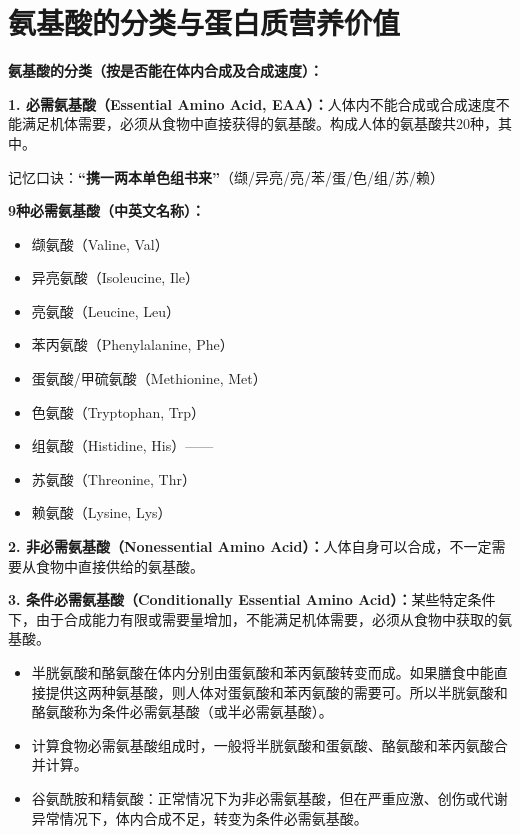 \section{氨基酸的分类与蛋白质营养价值}

\begin{keybox}
\textbf{氨基酸的分类（按是否能在体内合成及合成速度）：}

\textbf{1. 必需氨基酸（Essential Amino Acid, EAA）：}人体内不能合成或合成速度不能满足机体需要，必须从食物中直接获得的氨基酸。构成人体的氨基酸共20种，其中。

记忆口诀：\textbf{``携一两本单色组书来''}（缬/异亮/亮/苯/蛋/色/组/苏/赖）

\textbf{9种必需氨基酸（中英文名称）：}
\begin{itemize}[leftmargin=*]
    \item 缬氨酸（Valine, Val）
    \item 异亮氨酸（Isoleucine, Ile）
    \item 亮氨酸（Leucine, Leu）
    \item 苯丙氨酸（Phenylalanine, Phe）
    \item 蛋氨酸/甲硫氨酸（Methionine, Met）
    \item 色氨酸（Tryptophan, Trp）
    \item 组氨酸（Histidine, His）——
    \item 苏氨酸（Threonine, Thr）
    \item 赖氨酸（Lysine, Lys）
\end{itemize}

\textbf{2. 非必需氨基酸（Nonessential Amino Acid）：}人体自身可以合成，不一定需要从食物中直接供给的氨基酸。

\textbf{3. 条件必需氨基酸（Conditionally Essential Amino Acid）：}某些特定条件下，由于合成能力有限或需要量增加，不能满足机体需要，必须从食物中获取的氨基酸。
\begin{itemize}[leftmargin=*]
    \item 半胱氨酸和酪氨酸在体内分别由蛋氨酸和苯丙氨酸转变而成。如果膳食中能直接提供这两种氨基酸，则人体对蛋氨酸和苯丙氨酸的需要可。所以半胱氨酸和酪氨酸称为条件必需氨基酸（或半必需氨基酸）。
    \item 计算食物必需氨基酸组成时，一般将半胱氨酸和蛋氨酸、酪氨酸和苯丙氨酸合并计算。 %
    \item 谷氨酰胺和精氨酸：正常情况下为非必需氨基酸，但在严重应激、创伤或代谢异常情况下，体内合成不足，转变为条件必需氨基酸。 %
\end{itemize}


\end{keybox}
